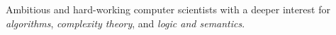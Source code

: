 Ambitious and hard-working computer scientists with a deeper interest for \emph{algorithms}, \emph{complexity theory}, and \emph{logic and semantics}.
